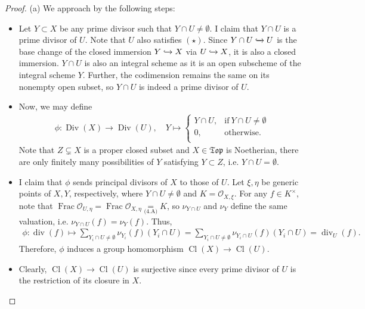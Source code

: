 \documentclass[11pt,a4paper,footinclude=true,headinclude=true]{scrbook} %
\DeclareMathOperator{\Frac}{Frac}
\DeclareMathOperator{\Div}{Div}
\DeclareMathOperator{\Cl}{Cl}
\DeclareMathOperator{\dv}{div}
\newcommand{\OO}{\mathcal{O}}
\newcommand{\Top}{\mathfrak{Top}}
\newcommand{\<}{\langle}
\newcommand{\>}{\rangle}
\begin{document}
\begin{proof}
    (a) We approach by the following steps:
    \begin{itemize}
        \item Let $Y\subset X$ be any prime divisor such that $Y\cap U\neq\emptyset$. I claim that $Y\cap U$ is a prime divisor of $U$. Note that $U$ also satisfies $(\star)$. Since $Y\cap U\xhookrightarrow{}U$ is the base change of the closed immersion $Y\xhookrightarrow{}X$ via $U\xhookrightarrow{}X$, it is also a closed immersion. $Y\cap U$ is also an integral scheme as it is an open subscheme of the integral scheme $Y$. Further, the codimension remains the same on its nonempty open subset, so $Y\cap U$ is indeed a prime divisor of $U$. 
        \item Now, we may define
        \begin{align*}
            \phi:\Div(X)\longrightarrow\Div(U),\quad Y\longmapsto
            \left\{\begin{array}{lc} 
            Y\cap U, &\text{if}\ Y\cap U\neq\emptyset \\ 
            0, &\text{otherwise}.\\ 
        \end{array}\right.
        \end{align*}
        Note that $Z\subsetneq X$ is a proper closed subset and $X\in\Top$ is Noetherian, there are only finitely many possibilities of $Y$ satisfying $Y\subset Z$, i.e. $Y\cap U=\emptyset$. 
        \item I claim that $\phi$ sends principal divisors of $X$ to those of $U$. Let $\xi,\eta$ be generic points of $X,Y$, respectively, where $Y\cap U\neq\emptyset$ and $K=\OO_{X,\xi}$. For any $f\in K^\times$, note that $\Frac\OO_{U,\eta}=\Frac\OO_{X,\eta}\underset{\text{(4.A)}}{=}K$, so $\nu_{Y\cap U}$ and $\nu_Y$ define the same valuation, i.e. $\nu_{Y\cap U}(f)=\nu_Y(f)$. Thus,
        \begin{align*}
            \phi:\dv(f)\longmapsto\sum_{Y_i\cap U\neq\emptyset}\nu_{Y_i}(f)(Y_i\cap U)=\sum_{Y_i\cap U\neq\emptyset}\nu_{Y_i\cap U}(f)(Y_i\cap U)=\dv_U(f).
        \end{align*}
        Therefore, $\phi$ induces a group homomorphism $\Cl(X)\to\Cl(U)$.
        \item Clearly, $\Cl(X)\to\Cl(U)$ is surjective since every prime divisor of $U$ is the restriction of its closure in $X$.
    \end{itemize}
    

\end{proof}
\end{document}
